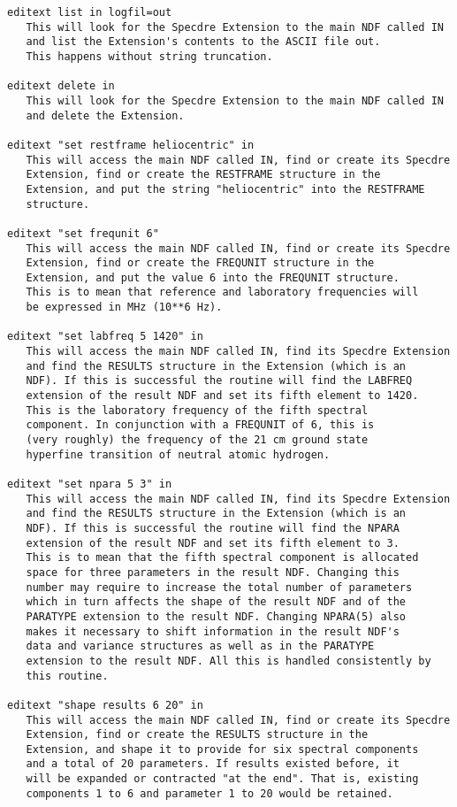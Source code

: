\begin{description}
\begin{verbatim}
editext list in logfil=out
   This will look for the Specdre Extension to the main NDF called IN
   and list the Extension's contents to the ASCII file out.
   This happens without string truncation.

editext delete in
   This will look for the Specdre Extension to the main NDF called IN
   and delete the Extension.

editext "set restframe heliocentric" in
   This will access the main NDF called IN, find or create its Specdre
   Extension, find or create the RESTFRAME structure in the
   Extension, and put the string "heliocentric" into the RESTFRAME
   structure.

editext "set frequnit 6"
   This will access the main NDF called IN, find or create its Specdre
   Extension, find or create the FREQUNIT structure in the
   Extension, and put the value 6 into the FREQUNIT structure.
   This is to mean that reference and laboratory frequencies will
   be expressed in MHz (10**6 Hz).

editext "set labfreq 5 1420" in
   This will access the main NDF called IN, find its Specdre Extension
   and find the RESULTS structure in the Extension (which is an
   NDF). If this is successful the routine will find the LABFREQ
   extension of the result NDF and set its fifth element to 1420.
   This is the laboratory frequency of the fifth spectral
   component. In conjunction with a FREQUNIT of 6, this is
   (very roughly) the frequency of the 21 cm ground state
   hyperfine transition of neutral atomic hydrogen.

editext "set npara 5 3" in
   This will access the main NDF called IN, find its Specdre Extension
   and find the RESULTS structure in the Extension (which is an
   NDF). If this is successful the routine will find the NPARA
   extension of the result NDF and set its fifth element to 3.
   This is to mean that the fifth spectral component is allocated
   space for three parameters in the result NDF. Changing this
   number may require to increase the total number of parameters
   which in turn affects the shape of the result NDF and of the
   PARATYPE extension to the result NDF. Changing NPARA(5) also
   makes it necessary to shift information in the result NDF's
   data and variance structures as well as in the PARATYPE
   extension to the result NDF. All this is handled consistently by
   this routine.

editext "shape results 6 20" in
   This will access the main NDF called IN, find or create its Specdre
   Extension, find or create the RESULTS structure in the
   Extension, and shape it to provide for six spectral components
   and a total of 20 parameters. If results existed before, it
   will be expanded or contracted "at the end". That is, existing
   components 1 to 6 and parameter 1 to 20 would be retained.
\end{verbatim}


\end{description}
